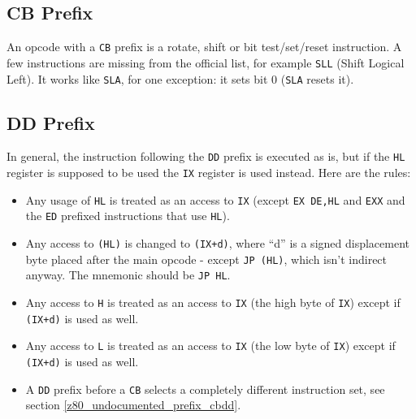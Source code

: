 \subsection{CB Prefix \cite{gerton}}
\label{z80_undocumented_prefix_cb}

An opcode with a {\tt CB} prefix is a rotate, shift or bit test/set/reset instruction. A few instructions are missing from the official list, for example {\tt SLL} (Shift Logical Left). It works like {\tt SLA}, for one exception: it sets bit 0 ({\tt SLA} resets it).


\subsection{DD Prefix \cite{gerton}}

In general, the instruction following the {\tt DD} prefix is executed as is, but if the {\tt HL} register is supposed to be used the {\tt IX} register is used instead. Here are the rules:

\begin{itemize}[topsep=1pt,itemsep=1pt]
	\item Any usage of {\tt HL} is treated as an access to {\tt IX} (except {\tt EX DE,HL} and {\tt EXX} and the {\tt ED} prefixed instructions that use {\tt HL}).
	
	\item Any access to {\tt (HL)} is changed to {\tt (IX+d)}, where ``d'' is a signed displacement byte placed after the main opcode - except {\tt JP (HL)}, which isn't indirect anyway. The mnemonic should be {\tt JP HL}.
	
	\item Any access to {\tt H} is treated as an access to {\tt IX\High} (the high byte of {\tt IX}) except if {\tt (IX+d)} is used as well.
	
	\item Any access to {\tt L} is treated as an access to {\tt IX\Low} (the low byte of {\tt IX}) except if {\tt (IX+d)} is used as well.
	
	\item A {\tt DD} prefix before a {\tt CB} selects a completely different instruction set, see section {\ref{z80_undocumented_prefix_cbdd}}.
\end{itemize}

